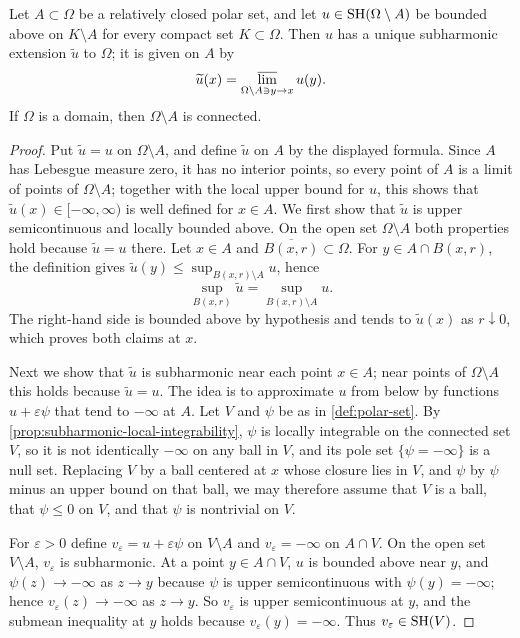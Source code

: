 \begin{theorem}\label{thm:polar-removable}
Let $A\subset\Omega$ be a relatively closed polar set, and let $u\in\mathrm{SH}(\Omega\setminus A)$ be bounded above on $K\setminus A$ for every compact set $K\subset\Omega$. Then $u$ has a unique subharmonic extension $\widetilde u$ to $\Omega$; it is given on $A$ by
\[
 \widetilde u(x)=\varlimsup_{\Omega\setminus A\ni y\to x}u(y).
\]
If $\Omega$ is a domain, then $\Omega\setminus A$ is connected.
\end{theorem}
\begin{proof}
Put $\widetilde u=u$ on $\Omega\setminus A$, and define $\widetilde u$ on $A$ by the displayed formula. Since $A$ has Lebesgue measure zero, it has no interior points, so every point of $A$ is a limit of points of $\Omega\setminus A$; together with the local upper bound for $u$, this shows that $\widetilde u(x)\in[-\infty,\infty)$ is well defined for $x\in A$. We first show that $\widetilde u$ is upper semicontinuous and locally bounded above. On the open set $\Omega\setminus A$ both properties hold because $\widetilde u=u$ there. Let $x\in A$ and $\overline{B(x,r)}\subset\Omega$. For $y\in A\cap B(x,r)$, the definition gives $\widetilde u(y)\leq\sup_{B(x,r)\setminus A}u$, hence
\[
 \sup_{B(x,r)}\widetilde u=\sup_{B(x,r)\setminus A}u.
\]
The right-hand side is bounded above by hypothesis and tends to $\widetilde u(x)$ as $r\downarrow0$, which proves both claims at $x$.

Next we show that $\widetilde u$ is subharmonic near each point $x\in A$; near points of $\Omega\setminus A$ this holds because $\widetilde u=u$. The idea is to approximate $u$ from below by functions $u+\varepsilon\psi$ that tend to $-\infty$ at $A$. Let $V$ and $\psi$ be as in \cref{def:polar-set}. By \cref{prop:subharmonic-local-integrability}, $\psi$ is locally integrable on the connected set $V$, so it is not identically $-\infty$ on any ball in $V$, and its pole set $\{\psi=-\infty\}$ is a null set. Replacing $V$ by a ball centered at $x$ whose closure lies in $V$, and $\psi$ by $\psi$ minus an upper bound on that ball, we may therefore assume that $V$ is a ball, that $\psi\leq0$ on $V$, and that $\psi$ is nontrivial on $V$.

For $\varepsilon>0$ define $v_\varepsilon=u+\varepsilon\psi$ on $V\setminus A$ and $v_\varepsilon=-\infty$ on $A\cap V$. On the open set $V\setminus A$, $v_\varepsilon$ is subharmonic. At a point $y\in A\cap V$, $u$ is bounded above near $y$, and $\psi(z)\to-\infty$ as $z\to y$ because $\psi$ is upper semicontinuous with $\psi(y)=-\infty$; hence $v_\varepsilon(z)\to-\infty$ as $z\to y$. So $v_\varepsilon$ is upper semicontinuous at $y$, and the submean inequality at $y$ holds because $v_\varepsilon(y)=-\infty$. Thus $v_\varepsilon\in\mathrm{SH}(V)$.


\end{proof}
